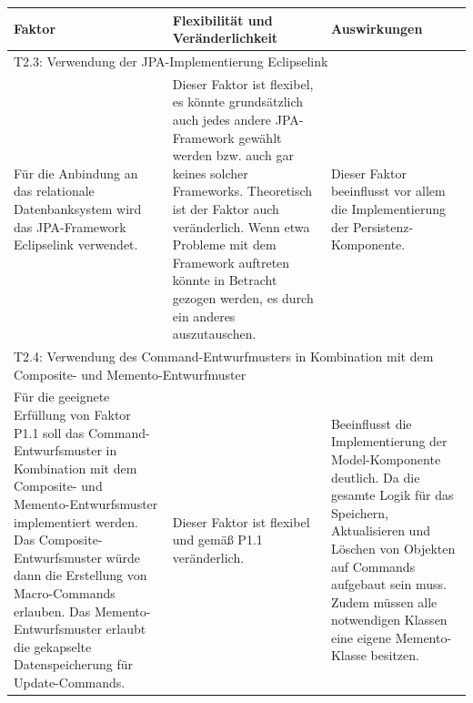 \documentclass[fontsize=12pt,paper=a4,twoside]{scrartcl}
\begin{document}
\begin{tabularx}{\textwidth}{|X|X|X|}
\hline
\textbf{Faktor} & \textbf{Flexibilität und Veränderlichkeit} & \textbf{Auswirkungen}\\\hline
\hline
\multicolumn{3}{|l|}{T2.3: Verwendung der JPA-Implementierung Eclipselink}\\\hline
Für die Anbindung an das relationale Datenbanksystem wird das JPA-Framework Eclipselink verwendet. & Dieser Faktor ist flexibel, es könnte grundsätzlich auch jedes andere JPA-Framework gewählt werden bzw. auch gar keines solcher Frameworks. Theoretisch ist der Faktor auch veränderlich. Wenn etwa Probleme mit dem Framework auftreten könnte in Betracht gezogen werden, es durch ein anderes auszutauschen. & Dieser Faktor beeinflusst vor allem die Implementierung der Persistenz-Komponente. \\\hline
\multicolumn{3}{|p{\dimexpr\textwidth-2\tabcolsep\relax}|}{T2.4: Verwendung des Command-Entwurfmusters in Kombination mit dem Composite- und Memento-Entwurfmuster}\\\hline
Für die geeignete Erfüllung von Faktor P1.1 soll das Command-Entwurfsmuster in Kombination mit dem Composite- und Memento-Entwurfsmuster implementiert werden. Das Composite-Entwurfsmuster würde dann die Erstellung von Macro-Commands erlauben. Das Memento-Entwurfsmuster erlaubt die gekapselte Datenspeicherung für Update-Commands. & Dieser Faktor ist flexibel und gemäß P1.1 veränderlich. & Beeinflusst die Implementierung der Model-Komponente deutlich. Da die gesamte Logik für das Speichern, Aktualisieren und Löschen von Objekten auf Commands aufgebaut sein muss. Zudem müssen alle notwendigen Klassen eine eigene Memento-Klasse besitzen. \\\hline
\end{tabularx}
\end{document}
